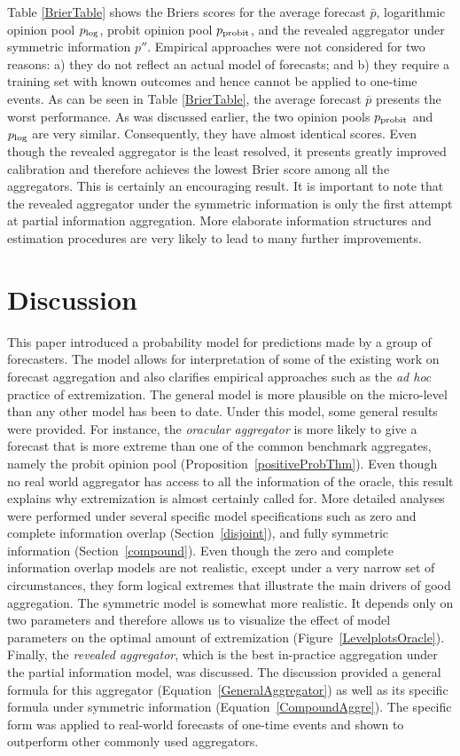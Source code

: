 \documentclass[11pt]{article}
\theoremstyle{definition}
\theoremstyle{definition}
\def\probit{p_{\rm probit}}
\def\plog{p_{\rm log}}
\begin{document}
Table \ref{BrierTable} shows the Briers scores for the average
forecast $\bar{p}$, logarithmic opinion pool $\plog$, probit opinion
pool $\probit$, and the revealed aggregator under symmetric
information $p''$. Empirical approaches were not considered for two
reasons: a) they do not reflect an actual model of forecasts; and b)
they require a training set with known outcomes and hence cannot be
applied to one-time events. As can be seen in Table \ref{BrierTable},
the average forecast $\bar{p}$ presents the worst performance. As was
discussed earlier, the two opinion pools $\probit$ and $\plog$ are
very similar. Consequently, they have almost identical scores. Even
though the revealed aggregator is the least resolved, it presents
greatly improved calibration and therefore achieves the lowest Brier
score among all the aggregators. This is certainly an encouraging
result. It is important to note that the revealed aggregator
under the symmetric information is only the first attempt at partial
information aggregation. More elaborate information structures and
estimation procedures are very likely to lead to many further
improvements.

\section{Discussion}
\label{discussion}
This paper introduced a probability model for predictions made by
a group of forecasters.  The model allows for interpretation of some
of the existing work on forecast aggregation and also clarifies
empirical approaches such as the {\em ad hoc} practice of
extremization.  The general model is more plausible on the micro-level
than any other model has been to date. Under this model, 
some general results were provided. For instance, the
\textit{oracular aggregator} is more likely to give a forecast that is
more extreme than one of the common benchmark aggregates, namely the
probit opinion pool (Proposition~\ref{positiveProbThm}).  Even though
no real world aggregator has access to all the information of the
oracle, this result explains why extremization is almost certainly
called for.  More detailed analyses  were performed under several
specific model specifications such as zero and complete information
overlap (Section~\ref{disjoint}), and fully symmetric information (Section~\ref{compound}).  Even though the zero and complete
information overlap models are not realistic, except under a very
narrow set of circumstances, they form logical extremes that illustrate the main drivers of good aggregation. The symmetric model is somewhat
more realistic. It depends only on two parameters and therefore allows us to visualize the effect of model parameters on the optimal amount of
extremization (Figure~\ref{LevelplotsOracle}).  Finally, the
{\em revealed aggregator}, which is the best in-practice aggregation
under the partial information model, was discussed. The discussion provided a general formula for
this aggregator (Equation~\ref{GeneralAggregator}) as well as its
specific formula under symmetric information
(Equation~\ref{CompoundAggre}). The specific form was applied to real-world forecasts 
of one-time events and shown to 
outperform other commonly used aggregators. 
\end{document}
